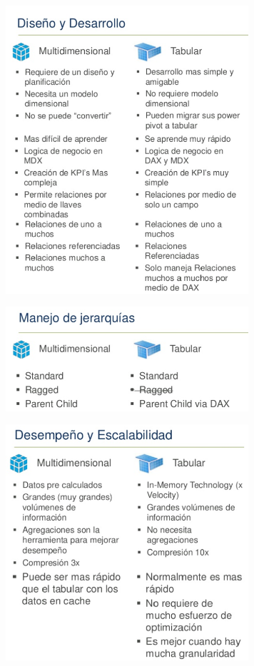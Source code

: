 \documentclass[%
 reprint,
 amsmath,amssymb,
 aps,
]{revtex4-1}
\begin{document}
\begin{center}
	\includegraphics[width=9cm]{./Imagenes/1}
\end{center}
\begin{center}
	\includegraphics[width=9cm]{./Imagenes/2}
\end{center}
\begin{center}
	\includegraphics[width=9cm]{./Imagenes/3}
\end{center}
\end{document}
